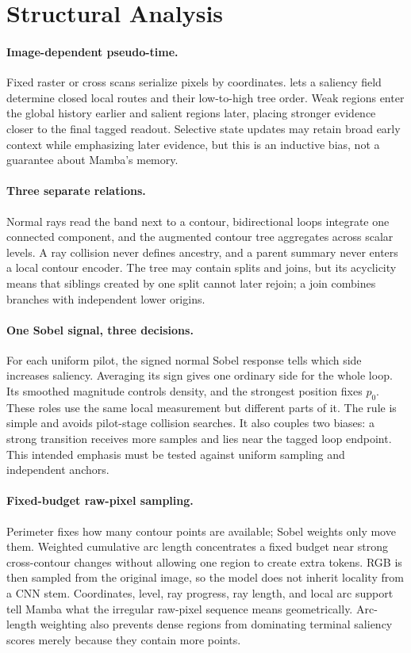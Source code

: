 \section{Structural Analysis}
\label{sec:analysis}

\paragraph{Image-dependent pseudo-time.}
Fixed raster or cross scans serialize pixels by coordinates. \method{} lets a saliency field determine closed local routes and their low-to-high tree order. Weak regions enter the global history earlier and salient regions later, placing stronger evidence closer to the final tagged readout. Selective state updates may retain broad early context while emphasizing later evidence, but this is an inductive bias, not a guarantee about Mamba's memory.

\paragraph{Three separate relations.}
Normal rays read the band next to a contour, bidirectional loops integrate one connected component, and the augmented contour tree aggregates across scalar levels. A ray collision never defines ancestry, and a parent summary never enters a local contour encoder. The tree may contain splits and joins, but its acyclicity means that siblings created by one split cannot later rejoin; a join combines branches with independent lower origins.

\paragraph{One Sobel signal, three decisions.}
For each uniform pilot, the signed normal Sobel response tells which side increases saliency. Averaging its sign gives one ordinary side for the whole loop. Its smoothed magnitude controls density, and the strongest position fixes $p_0$. These roles use the same local measurement but different parts of it. The rule is simple and avoids pilot-stage collision searches. It also couples two biases: a strong transition receives more samples and lies near the tagged loop endpoint. This intended emphasis must be tested against uniform sampling and independent anchors.

\paragraph{Fixed-budget raw-pixel sampling.}
Perimeter fixes how many contour points are available; Sobel weights only move them. Weighted cumulative arc length concentrates a fixed budget near strong cross-contour changes without allowing one region to create extra tokens. RGB is then sampled from the original image, so the model does not inherit locality from a CNN stem. Coordinates, level, ray progress, ray length, and local arc support tell Mamba what the irregular raw-pixel sequence means geometrically. Arc-length weighting also prevents dense regions from dominating terminal saliency scores merely because they contain more points.

